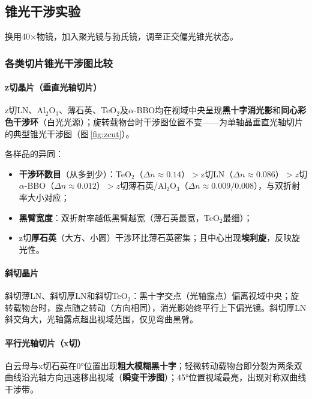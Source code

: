 \documentclass[a4paper,8pt,twocolumn]{article}
\begin{document}
\subsection{锥光干涉实验}

换用40×物镜，加入聚光镜与勃氏镜，调至正交偏光锥光状态。

\subsubsection{各类切片锥光干涉图比较}

\paragraph{z切晶片（垂直光轴切片）}

z切LN、Al$_2$O$_3$、薄石英、TeO$_2$及$\alpha$-BBO均在视域中央呈现\textbf{黑十字消光影}和\textbf{同心彩色干涉环}（白光光源）；旋转载物台时干涉图位置不变——为单轴晶垂直光轴切片的典型锥光干涉图（图\,\ref{fig:zcut}）。

各样品的异同：
\begin{itemize}
  \item \textbf{干涉环数目}（从多到少）：TeO$_2$（$\Delta n\approx0.14$）$>$z切LN（$\Delta n\approx0.086$）$>z$切$\alpha$-BBO（$\Delta n\approx0.012$）$>z$切薄石英/Al$_2$O$_3$（$\Delta n\approx0.009/0.008$），与双折射率大小对应；
  \item \textbf{黑臂宽度}：双折射率越低黑臂越宽（薄石英最宽，TeO$_2$最细）；
  \item z切\textbf{厚石英}（大方、小圆）干涉环比薄石英密集；且中心出现\textbf{埃利旋}，反映旋光性。
\end{itemize}

\paragraph{斜切晶片}

斜切薄LN、斜切厚LN和斜切TeO$_2$：黑十字交点（光轴露点）偏离视域中央；旋转载物台时，露点随之转动（方向相同），消光影始终平行上下偏光镜。斜切厚LN斜交角大，光轴露点超出视域范围，仅见弯曲黑臂。

\paragraph{平行光轴切片（x切）}

白云母与x切石英在0°位置出现\textbf{粗大模糊黑十字}；轻微转动载物台即分裂为两条双曲线沿光轴方向迅速移出视域（\textbf{瞬变干涉图}）；45°位置视域最亮，出现对称双曲线干涉带。
\end{document}
